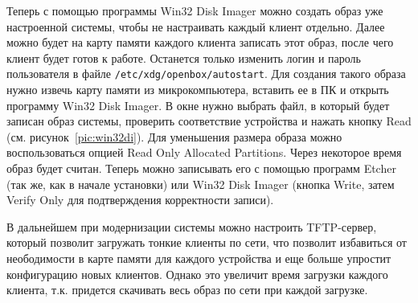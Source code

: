 Теперь с помощью программы Win32 Disk Imager \cite{ref:win32di} можно создать образ уже
настроенной системы, чтобы не настраивать каждый клиент отдельно. Далее можно будет на
карту памяти каждого клиента записать этот образ, после чего клиент будет готов к
работе. Останется только изменить логин и пароль пользователя в файле
\texttt{/etc/xdg/openbox/autostart}. Для создания такого образа нужно извечь карту
памяти из микрокомпьютера, вставить ее в ПК и открыть программу Win32 Disk Imager. В
окне нужно выбрать файл, в который будет записан образ системы, проверить соответствие
устройства и нажать кнопку Read (см. рисунок~\ref{pic:win32di}). Для уменьшения размера
образа можно воспользоваться опцией Read Only Allocated Partitions. Через некоторое
время образ будет считан. Теперь можно записывать его с помощью программ Etcher (так же,
как в начале установки) или Win32 Disk Imager (кнопка Write, затем Verify Only для
подтверждения корректности записи).

В дальнейшем при модернизации системы можно настроить TFTP-сервер, который позволит
загружать тонкие клиенты по сети, что позволит избавиться от неободимости в карте
памяти для каждого устройства и еще больше упростит конфигурацию новых клиентов. Однако
это увеличит время загрузки каждого клиента, т.к. придется скачивать весь образ по сети
при каждой загрузке.
